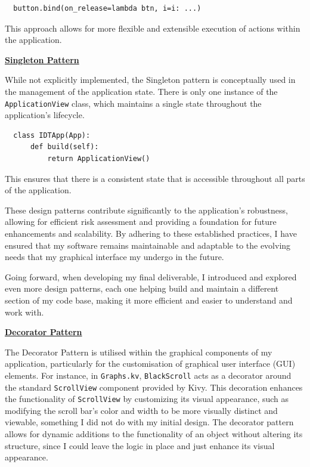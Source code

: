 \documentclass{article}
\begin{document}
\begin{verbatim}
  button.bind(on_release=lambda btn, i=i: ...)
\end{verbatim}

This approach allows for more flexible and extensible execution of actions within the application.\\\vspace{0.3cm}

\underline{\textbf{Singleton Pattern}}\\\vspace{0.3cm}

While not explicitly implemented, the Singleton pattern is conceptually used in the management of the application state. There is only one instance of the \texttt{ApplicationView} class, which maintains a single state throughout the application's lifecycle.

\begin{verbatim}
  class IDTApp(App):
      def build(self):
          return ApplicationView()
\end{verbatim}

This ensures that there is a consistent state that is accessible throughout all parts of the application.\\\vspace{0.3cm}

These design patterns contribute significantly to the application's robustness, allowing for efficient risk assessment and providing a foundation for future enhancements and scalability. By adhering to these established practices, I have ensured that my software remains maintainable and adaptable to the evolving needs that my graphical interface my undergo in the future.\\\vspace{0.3cm}

Going forward, when developing my final deliverable, I introduced and explored even more design patterns, each one helping build and maintain a different section of my code base, making it more efficient and easier to understand and work with.\\\vspace{0.3cm}

\underline{\textbf{Decorator Pattern}}\\\vspace{0.3cm}

The Decorator Pattern is utilised within the graphical components of my application, particularly for the customisation of graphical user interface (GUI) elements. For instance, in \texttt{Graphs.kv}, \texttt{BlackScroll} acts as a decorator around the standard \texttt{ScrollView} component provided by Kivy. This decoration enhances the functionality of \texttt{ScrollView} by customizing its visual appearance, such as modifying the scroll bar's color and width to be more visually distinct and viewable, something I did not do with my initial design. The decorator pattern allows for dynamic additions to the functionality of an object without altering its structure, since I could leave the logic in place and just enhance its visual appearance.
\end{document}
